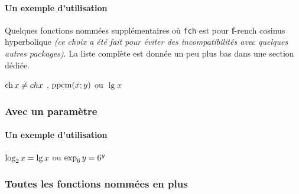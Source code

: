 \documentclass[12pt,a4paper]{article}
\theoremstyle{definition}
\begin{document}
\paragraph{Un exemple d'utilisation}

Quelques fonctions nommées supplémentaires où \verb+fch+ est pour \og \textbf{f}-rench \fg{} cosinus hyperbolique \emph{(ce choix a été fait pour éviter des incompatibilités avec quelques autres packages)}. La liste complète est donnée un peu plus bas dans une section dédiée.

\begin{latexex}
$\operatorname{\operatorname{ch}} x \neq ch x$ ,
$\operatorname{\operatorname{ppcm}}(x;y)$ ou
$\lg x$
\end{latexex}




\subsubsection{Avec un paramètre}

\paragraph{Un exemple d'utilisation}

\begin{latexex}
$\log_{2} x = \lg x$ ou
$\exp_{6} y = 6^y$
\end{latexex}




\subsubsection{Toutes les fonctions nommées en plus}

\vspace{-1em}
\end{document}
